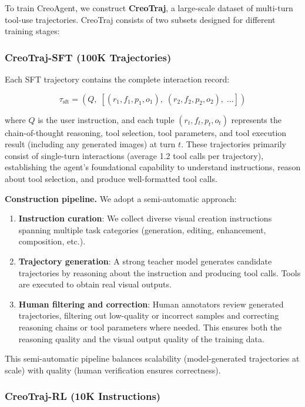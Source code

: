 \documentclass{article}
\begin{document}
To train CreoAgent, we construct \textbf{CreoTraj}, a large-scale dataset of multi-turn tool-use trajectories. CreoTraj consists of two subsets designed for different training stages:

\subsubsection{CreoTraj-SFT (100K Trajectories)}

Each SFT trajectory contains the complete interaction record:

$$\tau_{\text{sft}} = (Q, \; [(r_1, f_1, p_1, o_1), \; (r_2, f_2, p_2, o_2), \; \ldots])$$

where $Q$ is the user instruction, and each tuple $(r_t, f_t, p_t, o_t)$ represents the chain-of-thought reasoning, tool selection, tool parameters, and tool execution result (including any generated images) at turn $t$. These trajectories primarily consist of single-turn interactions (average 1.2 tool calls per trajectory), establishing the agent's foundational capability to understand instructions, reason about tool selection, and produce well-formatted tool calls.

\textbf{Construction pipeline.} We adopt a semi-automatic approach:

\begin{enumerate}
    \item \textbf{Instruction curation}: We collect diverse visual creation instructions spanning multiple task categories (generation, editing, enhancement, composition, etc.).
    \item \textbf{Trajectory generation}: A strong teacher model generates candidate trajectories by reasoning about the instruction and producing tool calls. Tools are executed to obtain real visual outputs.
    \item \textbf{Human filtering and correction}: Human annotators review generated trajectories, filtering out low-quality or incorrect samples and correcting reasoning chains or tool parameters where needed. This ensures both the reasoning quality and the visual output quality of the training data.
\end{enumerate}

This semi-automatic pipeline balances scalability (model-generated trajectories at scale) with quality (human verification ensures correctness).

\subsubsection{CreoTraj-RL (10K Instructions)}
\end{document}
